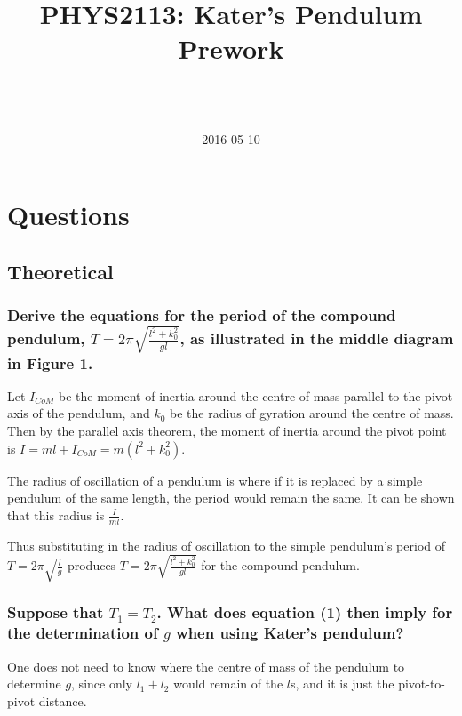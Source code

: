 \documentclass[a4paper]{scrartcl}
\begin{document}
\title{PHYS2113: Kater's Pendulum Prework}
\author{ \\ \\ }
\date{2016-05-10}
\maketitle

\section{Questions}
\subsection{Theoretical}
\subsubsection{Derive the equations for the period of the compound pendulum, \(T = 2 \pi \sqrt{\frac{l^2 + k_0^2}{g l}}\), as illustrated in the middle diagram in Figure 1.}
Let \(I_{CoM}\) be the moment of inertia around the centre of mass parallel to the pivot axis of the pendulum, and \(k_0\) be the radius of gyration around the centre of mass. Then by the parallel axis theorem, the moment of inertia around the pivot point is \(I = m l + I_{CoM} = m (l^2 + k_0^2)\).

The radius of oscillation of a pendulum is where if it is replaced by a simple pendulum of the same length, the period would remain the same. It can be shown that this radius is \(\frac{I}{m l}\).

Thus substituting in the radius of oscillation to the simple pendulum's period of \(T = 2 \pi \sqrt{\frac{l}{g}}\) produces \(T = 2 \pi \sqrt{\frac{l^2 + k_0^2}{g l}}\) for the compound pendulum.

\subsubsection{Suppose that \(T_1 = T_2\). What does equation (1) then imply for the determination of \(g\) when using Kater's pendulum?}
One does not need to know where the centre of mass of the pendulum to determine \(g\), since only \(l_1 + l_2\) would remain of the \(l\)s, and it is just the pivot-to-pivot distance.
\end{document}
